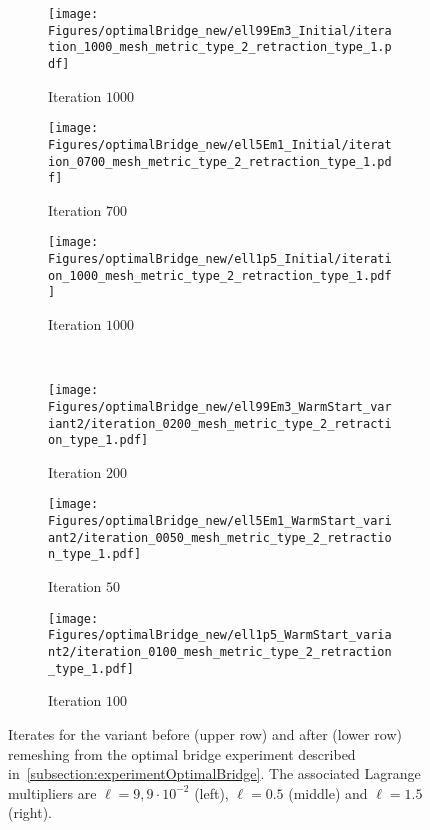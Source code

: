 \begin{figure}
	\begin{center}
	\begin{subfigure}{0.32\textwidth}
		\centering
		\texttt{[image: Figures/optimalBridge\_new/ell99Em3\_Initial/iteration\_1000\_mesh\_metric\_type\_2\_retraction\_type\_1.pdf]}
		\caption{Iteration $1000$}
	\end{subfigure}
	\hfill
	\begin{subfigure}{0.32\textwidth}
		\centering
		\texttt{[image: Figures/optimalBridge\_new/ell5Em1\_Initial/iteration\_0700\_mesh\_metric\_type\_2\_retraction\_type\_1.pdf]}
		\caption{Iteration $700$}
	\end{subfigure}
	\hfill
	\begin{subfigure}{0.32\textwidth}
		\centering
		\texttt{[image: Figures/optimalBridge\_new/ell1p5\_Initial/iteration\_1000\_mesh\_metric\_type\_2\_retraction\_type\_1.pdf]}
		\caption{Iteration $1000$}
	\end{subfigure}
	\\
	\begin{subfigure}{0.32\textwidth}
		\centering
		\texttt{[image: Figures/optimalBridge\_new/ell99Em3\_WarmStart\_variant2/iteration\_0200\_mesh\_metric\_type\_2\_retraction\_type\_1.pdf]}
		\caption{Iteration $200$}
	\end{subfigure}
	\hfill
	\begin{subfigure}{0.32\textwidth}
		\centering
		\texttt{[image: Figures/optimalBridge\_new/ell5Em1\_WarmStart\_variant2/iteration\_0050\_mesh\_metric\_type\_2\_retraction\_type\_1.pdf]}
			\caption{Iteration $50$}
	\end{subfigure}
	\hfill
	\begin{subfigure}{0.32\textwidth}
		\centering
		\texttt{[image: Figures/optimalBridge\_new/ell1p5\_WarmStart\_variant2/iteration\_0100\_mesh\_metric\_type\_2\_retraction\_type\_1.pdf]}
			\caption{Iteration $100$}
	\end{subfigure}
\end{center}
	\caption{Iterates for the variant \ElasEuc before (upper row) and after (lower row) remeshing from the optimal bridge experiment described in~\cref{subsection:experimentOptimalBridge}. The associated Lagrange multipliers are $\ell = 9,9 \cdot 10^{-2}$ (left), $\ell = 0.5$ (middle) and $\ell=1.5$ (right).}
	\label{fig:iterations_before_after_remeshing_variant2}
\end{figure}

